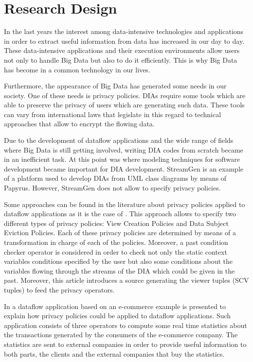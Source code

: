 \chapter[Research Design]{Research Design}
\label{sec:chapter3}

In the last years the interest among data-intensive technologies and applications in order to extract useful information from data has increased in our day to day. These data-intensive applications and their execution environments allow users not only to handle Big Data but also to do it efficiently. This is why Big Data has become in a common technology in our lives.

Furthermore, the appearance of Big Data has generated some needs in our society. One of these needs is privacy policies. DIAs require some tools which are able to preserve the privacy of users which are generating such data. These tools can vary from international laws that legislate in this regard to technical approaches that allow to encrypt the flowing data.

Due to the development of dataflow applications and the wide range of fields where Big Data is still getting involved, writing DIA codes from scratch became in an inefficient task. At this point was where modeling techniques for software development became important for DIA development. StreamGen is an example of a platform used to develop DIAs from UML class diagrams by means of Papyrus. However, StreamGen does not allow to specify privacy policies.

Some approaches can be found in the literature about privacy policies applied to dataflow applications as it is the case of \cite{privacypoliciesarticle}. This approach allows to specify two different types of privacy policies: View Creation Policies and Data Subject Eviction Policies. Each of these privacy policies are determined by means of a transformation in charge of each of the policies. Moreover, a past condition checker operator is considered in order to check not only the static context variables conditions specified by the user but also some conditions about the variables flowing through the streams of the DIA which could be given in the past. Moreover, this article introduces a source generating the viewer tuples (SCV tuples) to feed the privacy operators.

In \cite{privacypoliciesarticle} a dataflow application based on an e-commerce example is presented to explain how privacy policies could be applied to dataflow applications. Such application consists of three operators to compute some real time statistics about the transactions generated by the consumers of the e-commerce company. The statistics are sent to external companies in order to provide useful information to both parts, the clients and the external companies that buy the statistics.

